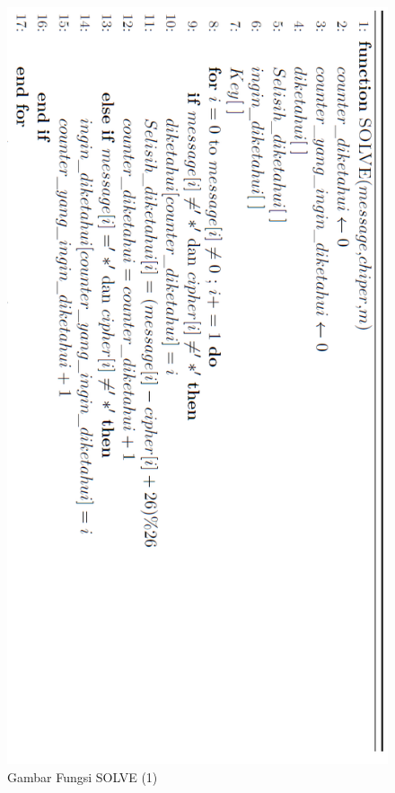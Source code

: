   
  \begin{figure}[H]
		\centering
		\includegraphics[scale=0.43]{images/bab3/solvefx1.png}
		\caption{Gambar Fungsi SOLVE (1)}
		\label{fig:solvefx1}
	\end{figure}
